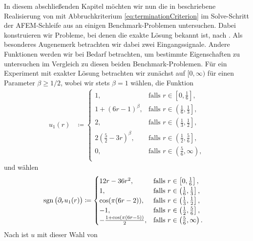 In diesem abschließenden Kapitel möchten wir nun die in
 beschriebene Realisierung von
 mit Abbruchkriterium
\eqref{eq:terminationCriterion} im Solve-Schritt der AFEM-Schleife aus
 an einigen Benchmark-Problemen untersuchen.
Dabei konstruieren wir Probleme, bei denen die exakte Lösung bekannt ist,
nach . 
Als besonderes Augenemerk betrachten wir dabei zwei Eingangssignale.
Andere Funktionen werden wir bei Bedarf betrachten, um bestimmte Eigenschaften
zu untersuchen im Vergleich zu diesen beiden Benchmark-Problemen.
Für ein Experiment mit exakter Lösung betrachten wir zunächst auf $[0,\infty)$
für einen Parameter $\beta\geq 1/2$, wobei wir stets $\beta =1$ wählen, 
die Funktion
\begin{align*}
  u_1(r)&\coloneqq
  \begin{cases}
    1, 
    & \text{falls } r\in \left[0,\frac{1}{6}\right],\\
    1+(6r-1)^\beta, 
    & \text{falls } r\in \left(\frac{1}{6}, \frac{1}{3}\right],\\
    2, 
    & \text{falls } r\in \left(\frac{1}{3}, \frac{1}{2}\right],\\
    2\left(\frac{5}{2}-3r\right)^\beta, 
    & \text{falls } r\in \left(\frac{1}{2}, \frac{5}{6}\right],\\
    0, 
    & \text{falls } r\in \left(\frac{5}{6}, \infty\right),\\
  \end{cases}
\end{align*}
und wählen
\begin{align*}
  \operatorname{sgn}\big(\partial_r u_1(r)\big) 
  &\coloneqq
  \begin{cases}
    12r-36r^2, 
    & \text{falls } r\in \left[0,\frac{1}{6}\right],\\
    1, 
    & \text{falls } r\in \left(\frac{1}{6}, \frac{1}{3}\right],\\
    \cos(\pi(6r-2)), 
    & \text{falls } r\in \left(\frac{1}{3}, \frac{1}{2}\right],\\
    -1, 
    & \text{falls } r\in \left(\frac{1}{2}, \frac{5}{6}\right],\\
    -\frac{1+\cos(\pi(6r-5))}{2}, 
    & \text{falls } r\in \left(\frac{5}{6}, \infty\right).
  \end{cases}
\end{align*}
Nach  ist $u$ mit dieser Wahl von
